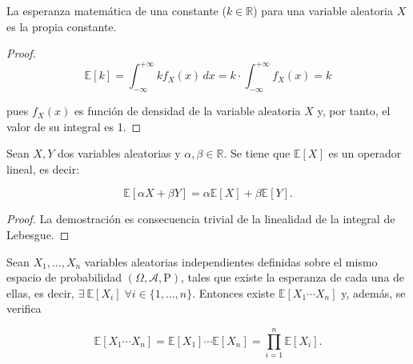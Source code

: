 \begin{proposicion}
    La esperanza matemática de una constante ($k \in \mathbb{R}$) para una variable aleatoria $X$ es la propia constante.
\end{proposicion}

\begin{proof}
    \[ \mathbb{E}[k] = \int_{-\infty}^{+\infty} k f_{X}(x) \, dx = k\cdot \int_{-\infty}^{+\infty} f_{X}(x) = k \]

    pues $f_{X}(x)$ es función de densidad de la variable aleatoria $X$ y, por tanto, el valor de su integral es 1.
\end{proof}

\begin{proposicion}
    Sean $X, Y$ dos variables aleatorias y $\alpha, \beta \in \mathbb{R}$. Se tiene que $\mathbb{E}[X]$ es un operador lineal, es decir:

    \[ \mathbb{E}[\alpha X + \beta Y] = \alpha\mathbb{E}[X] + \beta\mathbb{E}[Y]. \]
\end{proposicion}

\begin{proof}
    La demostración es consecuencia trivial de la linealidad de la integral de Lebesgue.
\end{proof}

\begin{teorema}
    Sean $X_1, \ldots, X_n$ variables aleatorias independientes definidas sobre el mismo espacio de probabilidad $(\Omega, \mathcal{A}, \mathrm{P})$, tales que existe la esperanza de cada una de ellas, es decir, $\exists \ \mathbb{E}[X_i] \; \forall i \in \{1, \ldots, n \}$. Entonces existe $\mathbb{E}[X_1 \cdots X_n]$ y, además, se verifica

    \[ \mathbb{E}[X_1 \cdots X_n] = \mathbb{E}[X_1] \cdots \mathbb{E}[X_n] = \prod_{i=1}^n \mathbb{E}[X_i]. \]
\end{teorema}

